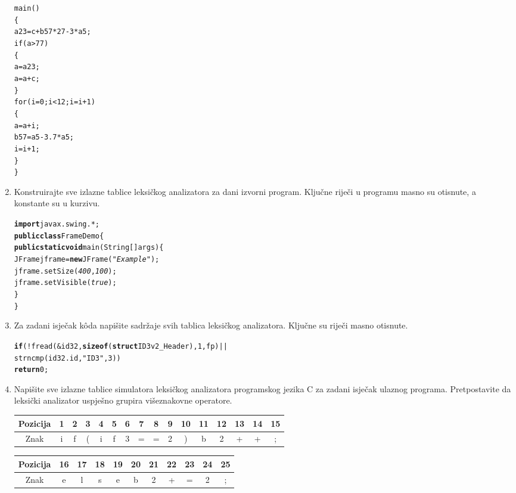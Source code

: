 \documentclass[times, 12pt, utf8]{book}
\begin{document}
\begin{enumerate}[resume]
\noindent
\begin{alltt}
main()
\verb|{|
  a23=c+b57*27-3*a5;
  if(a>77)
  \verb|{|
    a=a23;
    a=a+c;
  \verb|}|
  for(i=0;i<12;i=i+1)
  \verb|{|
    a=a+i;
    b57=a5-3.7*a5;
    i=i+1;
  \verb|}|
\verb|}|
\end{alltt} 

\item
Konstruirajte sve izlazne tablice leksičkog analizatora za dani izvorni program.
Ključne riječi u programu masno su otisnute, a konstante su u kurzivu. \cite[str.~51]{udzbenik} \cite{auditorne}

\begin{alltt}
\textbf{import} javax.swing.*;
\textbf{public class} FrameDemo \verb|{|
  \textbf{public static void} main(String[] args) \verb|{|
    JFrame jframe=\textbf{new} JFrame(\textit{"Example"});
    jframe.setSize(\textit{400},\textit{100});
    jframe.setVisible(\textit{true});
  \verb|}|
\verb|}|
\end{alltt} 

\item
Za zadani isječak kôda napišite sadržaje svih tablica leksičkog analizatora.
Ključne su riječi masno otisnute. \cite[str.~51]{udzbenik} \cite{auditorne}

\begin{alltt}
\textbf{if} (!fread(&id32, \textbf{sizeof}(\textbf{struct} ID3v2_Header),1,fp) ||
    strncmp(id32.id,"ID3",3))
  \textbf{return} 0;
\end{alltt} 

\item
Napišite sve izlazne tablice simulatora leksičkog analizatora programskog jezika C za zadani isječak ulaznog programa.
Pretpostavite da leksički analizator uspješno grupira višeznakovne operatore. \cite[str.~51]{udzbenik} \cite{auditorne}

\begin{tabular}{ | c | c | c | c | c | c | c | c | c | c | c | c | c | c | c | c | } \hline
Pozicija & 1 & 2 & 3 & 4 & 5 & 6 & 7 & 8 & 9 & 10 & 11 & 12 & 13 & 14 & 15 \\ \hline
Znak & i & f & ( & i & f & 3 & = & = & 2 & ) & b & 2 & + & + & ; \\ \hline
\end{tabular}

\begin{tabular}{ | c | c | c | c | c | c | c | c | c | c | c | } \hline
Pozicija & 16 & 17 & 18 & 19 & 20 & 21 & 22 & 23 & 24 & 25 \\ \hline
Znak & e & l & s & e & b & 2 & + & = & 2 & ; \\ \hline
\end{tabular}


\end{enumerate}
\end{document}
